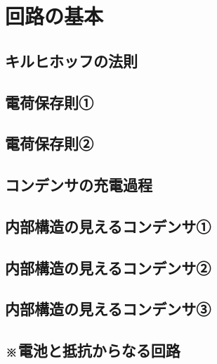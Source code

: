 \documentclass[../../ps_q.tex]{subfiles}
\begin{document}
    \section{回路の基本}
    \vspace{7pt}
    \subsection{キルヒホッフの法則}
            
        \vspace{20pt}
        \vfill
    \subsection{電荷保存則①}
        
        \vspace{20pt}
        \vfill
    \subsection{電荷保存則②}
        
        \vspace{20pt}
        \vfill
    \subsection{コンデンサの充電過程}
        
        \vspace{20pt}
        \vfill
    \subsection{内部構造の見えるコンデンサ①}
        
        \vspace{20pt}
        \vfill
    \subsection{内部構造の見えるコンデンサ②}
        
        \vspace{20pt}
        \vfill
    \subsection{内部構造の見えるコンデンサ③}
        
        \vspace{20pt}
        \vfill
    \subsection{※電池と抵抗からなる回路}
        
        \vspace{20pt}
        \vfill
\end{document}

